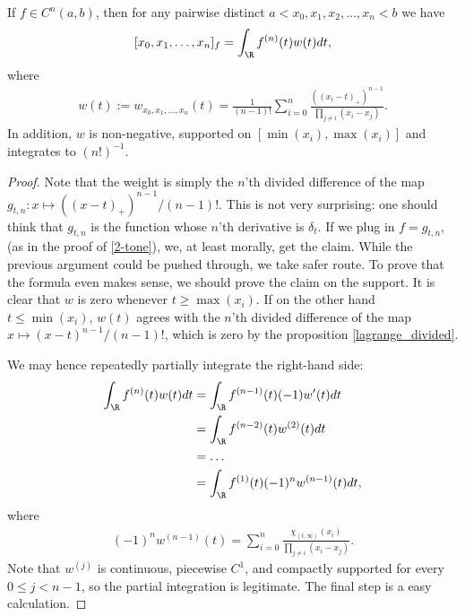 \begin{lause}\label{peano_theorem}
	If $f \in C^{n}(a, b)$, then for any pairwise distinct $a < x_{0}, x_{1}, x_{2}, \ldots, x_{n} < b$ we have
	\begin{align}\label{peano_identity}
		[x_{0}, x_{1}, \ldots, x_{n}]_{f} = \int_{\R} f^{(n)}(t) w(t) dt,
	\end{align}
	where
	\begin{align}\label{peano_weight}
		w(t) := w_{x_{0}, x_{1}, \ldots, x_{n}}(t) = \frac{1}{(n - 1)!}\sum_{i = 0}^{n} \frac{((x_{i} - t)_{+})^{n - 1}}{\prod_{j \neq i} (x_{i} - x_{j})}.
	\end{align}
	In addition, $w$ is non-negative, supported on $[\min(x_{i}), \max(x_{i})]$ and integrates to $(n!)^{-1}$.
\end{lause}
\begin{proof}
	Note that the weight is simply the $n$'th divided difference of the map $g_{t, n} : x \mapsto ((x - t)_{+})^{n - 1}/(n - 1)!$. This is not very surprising: one should think that $g_{t, n}$ is the function whose $n$'th derivative is $\delta_{t}$. If we plug in $f = g_{t, n}$, (as in the proof of \ref{2-tone}), we, at least morally, get the claim. While the previous argument could be pushed through, we take safer route. To prove that the formula even makes sense, we should prove the claim on the support. It is clear that $w$ is zero whenever $t \geq \max(x_{i})$. If on the other hand $t \leq \min(x_{i})$, $w(t)$ agrees with the $n$'th divided difference of the map $x \mapsto (x - t)^{n - 1}/(n - 1)!$, which is zero by the proposition \ref{lagrange_divided}.

	We may hence repeatedly partially integrate the right-hand side:
	\begin{align*}
		 \int_{\R} f^{(n)}(t) w(t) dt &= \int_{\R} f^{(n - 1)}(t) (-1) w'(t) dt \\
		 &= \int_{\R} f^{(n - 2)}(t) w^{(2)}(t) dt \\
		 &= \ldots \\
		 &= \int_{\R} f^{(1)}(t) (-1)^{n} w^{(n - 1)}(t) dt,
	\end{align*}
	where
	\begin{align*}
		(-1)^{n} w^{(n - 1)}(t) = \sum_{i = 0}^{n} \frac{\chi_{(t, \infty)}(x_{i})}{\prod_{j \neq i} (x_{i} - x_{j})}.
	\end{align*}
	Note that $w^{(j)}$ is continuous, piecewise $C^{1}$, and compactly supported for every $0 \leq j < n - 1$, so the partial integration is legitimate. The final step is a easy calculation.


\end{proof}

